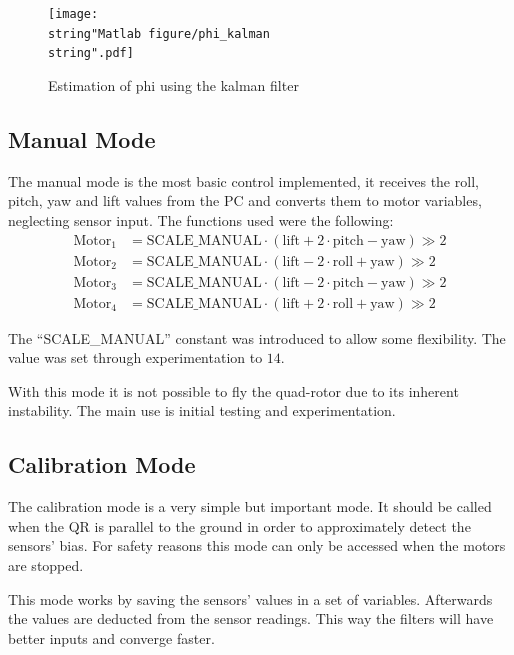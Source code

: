 \documentclass[11pt]{article}
\begin{document}
%
\begin{figure}[h]
\centering
\texttt{[image: \\string"Matlab figure/phi\_kalman\\string".pdf]}
\caption{Estimation of phi using the kalman filter}
\label{phiestimate}

\end{figure}


\subsection{Manual Mode}

The manual mode is the most basic control implemented, it receives the roll, pitch, yaw and lift values from the PC and converts them to motor variables, neglecting sensor input. The functions used were the following:
\begin{align}
\textrm{Motor}_1 &= \textrm{SCALE\_MANUAL} \cdot ( \textrm{lift} + 2 \cdot \textrm{pitch} - \textrm{yaw}) \gg 2 \\
\textrm{Motor}_2 &= \textrm{SCALE\_MANUAL} \cdot ( \textrm{lift} - 2 \cdot \textrm{roll} + \textrm{yaw}) \gg 2 \\
\textrm{Motor}_3 &= \textrm{SCALE\_MANUAL} \cdot ( \textrm{lift} - 2 \cdot \textrm{pitch} - \textrm{yaw}) \gg 2 \\
\textrm{Motor}_4 &= \textrm{SCALE\_MANUAL} \cdot ( \textrm{lift} + 2 \cdot \textrm{roll} + \textrm{yaw}) \gg 2
\end{align}

The ``SCALE\_MANUAL'' constant was introduced to allow some flexibility. The value was set through experimentation to $14$.

With this mode it is not possible to fly the quad-rotor due to its inherent instability. The main use is initial testing and experimentation.

\subsection{Calibration Mode}

The calibration mode is a very simple but important mode. It should be called when the QR is parallel to the ground in order to approximately detect the sensors' bias. For safety reasons this mode can only be accessed when the motors are stopped.

This mode works by saving the sensors' values in a set of variables. Afterwards the values are deducted from the sensor readings. This way the filters will have better inputs and converge faster.
 
\end{document}
